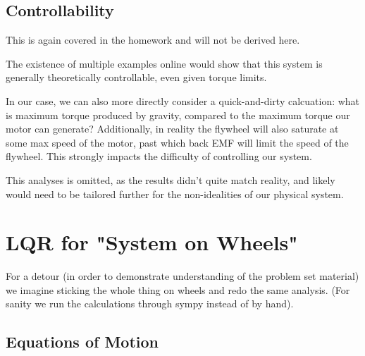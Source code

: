 \documentclass[conference]{IEEEtran}
\begin{document}
\subsection{Controllability}

This is again covered in the homework and will not be derived here.

The existence of multiple examples online would show that this system is
generally theoretically controllable, even given torque limits. 

In our case, we can also more directly consider a quick-and-dirty calcuation:
what is maximum torque produced by gravity, compared to the maximum torque our
motor can generate? Additionally, in reality the flywheel will also saturate at
some max speed of the motor, past which back EMF will limit the speed of the
flywheel. This strongly impacts the difficulty of controlling our system. 

This analyses is omitted, as the results didn't quite match reality, and likely
would need to be tailored further for the non-idealities of our physical system.





\section{LQR for "System on Wheels"}


For a detour (in order to demonstrate understanding of the problem set material)
we imagine sticking the whole thing on wheels and redo the same analysis.
(For sanity we run the calculations through sympy instead of by hand).


\subsection{Equations of Motion}
\end{document}
